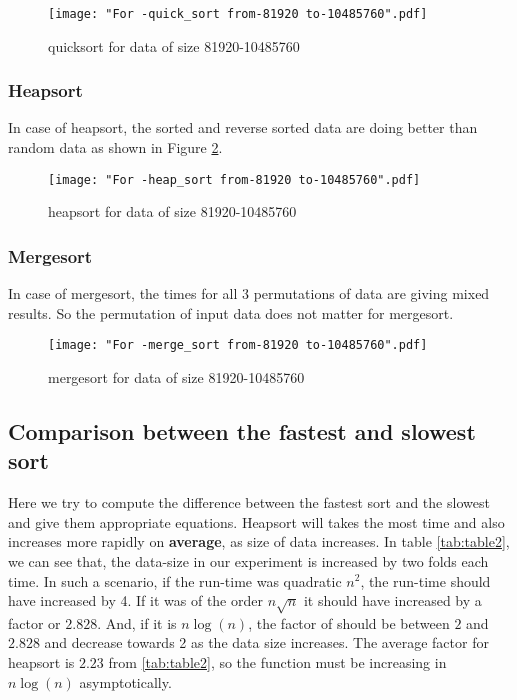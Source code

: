 \documentclass[sigconf, nonacm, natbib, screen, balance=False]{acmart}
\begin{document}
\begin{figure}[ht]
\texttt{[image: "For -quick\_sort from-81920 to-10485760".pdf]}
    \caption{quicksort for data of size 81920-10485760 }
    \label{fig:quicksort}
\end{figure}

\subsubsection{Heapsort}
In case of heapsort, the sorted and reverse sorted data are doing better than random data as shown in Figure \ref{fig:heapsort}.
\begin{figure}[ht]
\texttt{[image: "For -heap\_sort from-81920 to-10485760".pdf]}
    \caption{heapsort for data of size 81920-10485760 }
    \label{fig:heapsort}
\end{figure}

\subsubsection{Mergesort}
In case of mergesort, the times for all 3 permutations of data are giving mixed results. So the permutation of input data does not matter for mergesort.

\begin{figure}[ht]
\texttt{[image: "For -merge\_sort from-81920 to-10485760".pdf]}
    \caption{mergesort for data of size 81920-10485760 }
    \label{fig:mergesort}
\end{figure}


\subsection{Comparison between the fastest and slowest sort}\label{math}
Here we try to compute the difference between the fastest sort and the slowest and give them appropriate equations. Heapsort will takes the most time and also increases more rapidly on \textbf{average}, as size of data increases. In table \ref{tab:table2}, we can see that, the data-size in our experiment is increased by two folds each time. In such a scenario, if the run-time was quadratic $n^2$, the run-time should have increased by 4. If it was of the order $n\sqrt{n}$ it should have increased by a factor or $2.828$. And, if it is $n\log\left(n\right)$, the factor of should be between $2$ and $2.828$ and decrease towards 2 as the data size increases. The average factor for heapsort is $2.23$ from \ref{tab:table2}, so the function must be increasing in $n\log\left(n\right)$ asymptotically. 
\end{document}
